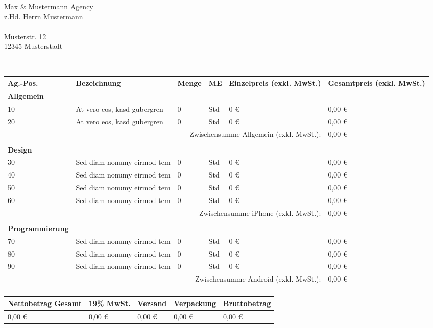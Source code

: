 \documentclass[DIN, pagenumber=false, parskip=half,
               fromalign=right, fromphone=true, fromfax=false,
               fromrule=false]{scrlttr2}
\begin{document}
 
\begin{letter}{
	Max \& Mustermann Agency\\ 
	z.Hd. Herrn Mustermann\\ \ \\
	Musterstr. 12\\
	12345 Musterstadt
}

\opening{\ }
\vspace{-1.5cm}

\begin{longtable}{p{2.5cm}p{5.5cm}p{1cm}p{1cm}p{2.5cm}p{2.5cm}}
	\hline 	
	Ag.-Pos. & Bezeichnung & Menge & ME & Einzelpreis (exkl. MwSt.) & Gesamtpreis (exkl. MwSt.)\\
	\hline 
	
	\textbf{Allgemein}\\
	10 & At vero eos, kasd gubergren & 0 & Std & 0 \euro{} & 0,00 \euro{}\\
	20 & At vero eos, kasd gubergren  & 0 & Std & 0 \euro{} & 0,00 \euro{}\\
	\multicolumn{5}{r}{Zwischensumme Allgemein (exkl. MwSt.):} & 0,00 \euro{}\\
	\\
	
	\textbf{Design}\\
	30 & Sed diam nonumy eirmod tem & 0 & Std & 0 \euro{} & 0,00 \euro{}\\
	40 & Sed diam nonumy eirmod tem & 0 & Std & 0 \euro{} & 0,00 \euro{}\\
	50 & Sed diam nonumy eirmod tem & 0 & Std & 0 \euro{} & 0,00 \euro{}\\
	60 & Sed diam nonumy eirmod tem & 0 & Std & 0 \euro{} & 0,00 \euro{}\\
	\multicolumn{5}{r}{Zwischensumme iPhone (exkl. MwSt.):} & 0,00 \euro{}\\
	\\
	
	\textbf{Programmierung}\\
	70 & Sed diam nonumy eirmod tem & 0 & Std & 0 \euro{} & 0,00 \euro{}\\
	80 & Sed diam nonumy eirmod tem & 0 & Std & 0 \euro{} & 0,00 \euro{}\\
	90 & Sed diam nonumy eirmod tem & 0 & Std & 0 \euro{} & 0,00 \euro{}\\
	\multicolumn{5}{r}{Zwischensumme Android (exkl. MwSt.):} & 0,00 \euro{}\\
	\\
	
	\hline\hline 
\end{longtable}


\begin{longtable}{p{5.5cm}p{2.5cm}p{2.5cm}p{2cm}p{3cm}}
	\hline Nettobetrag Gesamt & 19\% MwSt. & Versand & Verpackung & Bruttobetrag\\
	\hline 
	0,00 \euro{} & 0,00 \euro & 0,00 \euro & 0,00 \euro & 0,00 \euro{}\\
	\hline 
	\hline 	
\end{longtable}


\end{letter}
\end{document}
